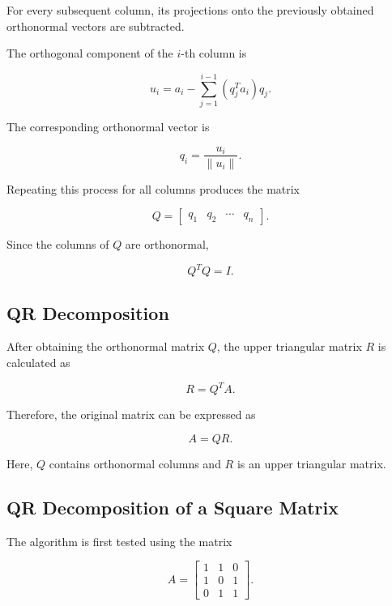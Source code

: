 \documentclass[12pt,a4paper]{article}
\numberwithin{equation}{section}
\begin{document}
For every subsequent column, its projections onto
the previously obtained orthonormal vectors are
subtracted.

The orthogonal component of the $i$-th column is

\begin{equation}
u_i=a_i-\sum_{j=1}^{i-1}(q_j^Ta_i)q_j.
\end{equation}

The corresponding orthonormal vector is

\begin{equation}
q_i=\frac{u_i}{\|u_i\|}.
\end{equation}

Repeating this process for all columns produces
the matrix

\begin{equation}
Q=
\begin{bmatrix}
q_1&q_2&\cdots&q_n
\end{bmatrix}.
\end{equation}

Since the columns of $Q$ are orthonormal,

\begin{equation}
\boxed{Q^TQ=I}.
\end{equation}

\subsection{QR Decomposition}

After obtaining the orthonormal matrix $Q$,
the upper triangular matrix $R$ is calculated as

\begin{equation}
\boxed{R=Q^TA}.
\end{equation}

Therefore, the original matrix can be expressed as

\begin{equation}
\boxed{A=QR}.
\end{equation}

Here, $Q$ contains orthonormal columns and $R$
is an upper triangular matrix.

\subsection{QR Decomposition of a Square Matrix}

The algorithm is first tested using the matrix

\begin{equation}
A=
\begin{bmatrix}
1&1&0\\
1&0&1\\
0&1&1
\end{bmatrix}.
\end{equation}
\end{document}
